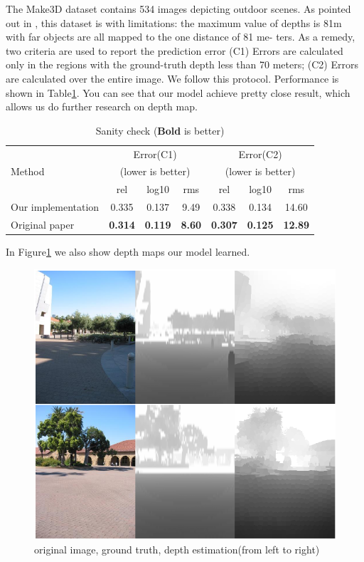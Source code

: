 \documentclass[10pt,twocolumn,letterpaper]{article}
\begin{document}
The Make3D dataset contains 534 images depicting outdoor scenes. As pointed out 
in \cite{liu2014discrete}, this dataset is with limitations: the maximum value 
of depths is 81m with far objects are all mapped to the one distance of 81 
me- ters. As a remedy, two criteria are used to report the prediction error (C1) 
Errors are calculated only in the regions with the ground-truth depth less 
than 70 meters; (C2) Errors are calculated over the entire image. We follow this 
protocol.
Performance is shown in Table\ref{tab:sanity}. 
You can see that
our model achieve pretty close result, which allows us do further research on depth map.
\begin{table} \center
\resizebox{\linewidth}{!} {
\begin{tabular}{ | l |  c  c  c | c  c  c |}
\hline 
\multirow{3}{*}{{{Method}}} &\multicolumn{3}{c|}{Error(C1)} 
&\multicolumn{3}{c|}{Error(C2)} \\
&\multicolumn{3}{c|}{(lower is better)} &\multicolumn{3}{c|}{(lower is better)} 
\\
\cline{2-7}
&rel &log10 &rms &rel &log10 &rms  \\
\hline
%
%
Our implementation &0.335&0.137&9.49&0.338&0.134&14.60 \\
Original paper    &\textbf{0.314}&\textbf{0.119}  &\textbf{8.60}  
&\textbf{0.307} 	 &\textbf{0.125}	 &\textbf{12.89} \\
\hline
\end{tabular}
}
\caption{Sanity check (\textbf{Bold} is better)}
\label{tab:sanity}
\end{table}

In Figure\ref{fig:depthest} we also show depth maps our model learned.
\begin{figure}
\includegraphics[width=\linewidth]{../learntd.png}
\caption{original image, ground truth, depth estimation(from left to right)}
\label{fig:depthest}
\end{figure}
\end{document}
